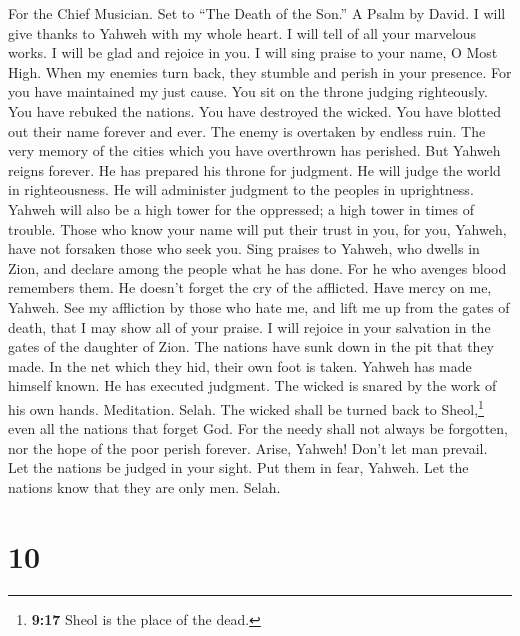 For the Chief Musician. Set to ``The Death of the Son.'' A Psalm by
David.  I will give thanks to Yahweh with my whole heart.
I will tell of all your marvelous works.  I will be glad
and rejoice in you. I will sing praise to your name, O Most High.
 When my enemies turn back, they stumble and perish in
your presence.  For you have maintained my just cause. You
sit on the throne judging righteously.  You have rebuked
the nations. You have destroyed the wicked. You have blotted out their
name forever and ever.  The enemy is overtaken by endless
ruin. The very memory of the cities which you have overthrown has
perished.  But Yahweh reigns forever. He has prepared his
throne for judgment.  He will judge the world in
righteousness. He will administer judgment to the peoples in
uprightness.  Yahweh will also be a high tower for the
oppressed; a high tower in times of trouble.  Those who
know your name will put their trust in you, for you, Yahweh, have not
forsaken those who seek you.  Sing praises to Yahweh, who
dwells in Zion, and declare among the people what he has done.
 For he who avenges blood remembers them. He doesn't
forget the cry of the afflicted.  Have mercy on me,
Yahweh. See my affliction by those who hate me, and lift me up from the
gates of death,  that I may show all of your praise. I
will rejoice in your salvation in the gates of the daughter of Zion.
 The nations have sunk down in the pit that they made. In
the net which they hid, their own foot is taken.  Yahweh
has made himself known. He has executed judgment. The wicked is snared
by the work of his own hands. Meditation. Selah.  The
wicked shall be turned back to Sheol,\footnote{\textbf{9:17} Sheol is
  the place of the dead.} even all the nations that forget God.
 For the needy shall not always be forgotten, nor the
hope of the poor perish forever.  Arise, Yahweh! Don't
let man prevail. Let the nations be judged in your sight.
 Put them in fear, Yahweh. Let the nations know that they
are only men. Selah.

\hypertarget{section-9}{%
\section{10}\label{section-9}}

